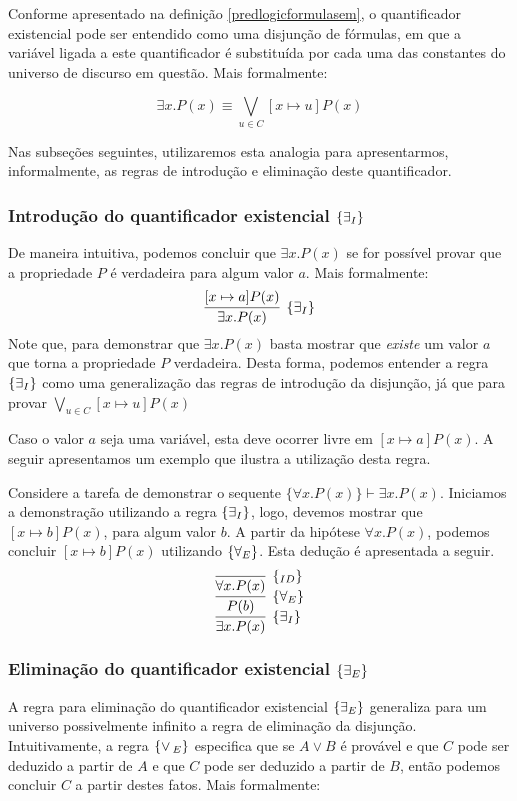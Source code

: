 Conforme apresentado na definição \ref{predlogicformulasem}, o
quantificador existencial pode ser entendido como uma disjunção de
fórmulas, em que a variável ligada a este quantificador é substituída
por cada uma das constantes do universo de discurso em questão. Mais
formalmente:

\[\exists x. P(x) \equiv \bigvee\limits_{u\in C}[x\mapsto u]P(x)\]

Nas subseções seguintes, utilizaremos esta analogia para
apresentarmos, informalmente, as regras de introdução e eliminação
deste quantificador.

\subsubsection{Introdução do quantificador existencial $\scriptsize{\{\exists_I}\}$}

De maneira intuitiva, podemos concluir que $\exists x. P(x)$ se for
possível provar que a propriedade $P$ é verdadeira para algum valor
$a$. Mais formalmente:
\[
\infer[\existsI]{\exists x. P(x)}
         {
           [x\mapsto a]P(x)
         }
\]
Note que, para demonstrar que $\exists x. P(x)$ basta mostrar que
\emph{existe} um valor $a$ que torna a propriedade $P$
verdadeira. Desta forma, podemos entender a regra $\scriptsize{\{\exists_I}\}$ como uma
generalização das regras de introdução da disjunção, já que para
provar $\bigvee_{u\in C}  [x\mapsto u]P(x)$

Caso o valor $a$ seja uma variável, esta deve ocorrer livre em
$[x\mapsto a]P(x)$. A seguir apresentamos um exemplo que ilustra a
utilização desta regra.
\begin{Example}
Considere a tarefa de demonstrar o sequente $\{\forall x. P(x)\}
\vdash \exists x. P(x)$. Iniciamos a demonstração utilizando a regra
$\scriptsize{\{\exists_I}\}$, logo, devemos mostrar que $[x\mapsto b]P(x)$, para algum
valor $b$. A partir da hipótese $\forall x .P(x)$, podemos concluir
$[x\mapsto b]P(x)$ utilizando $\scriptsize{\{\forall_E}\}$. Esta dedução é apresentada a
seguir.
\[
\infer[\existsI]{\exists x. P(x)}
        {
          \infer[\forallE]{P(b)}
                   {
                     \infer[\Id]{\forall x. P(x)}{}
                   }
        }
\]
\end{Example}

\subsubsection{Eliminação do quantificador existencial $\scriptsize{\{\exists_E}\}$}

A regra para eliminação do quantificador existencial $\scriptsize{\{\exists_E}\}$
generaliza para um universo possivelmente infinito a regra de
eliminação da disjunção. Intuitivamente,  a regra $\scriptsize{\{\lor\,_{E}\}}$ especifica
que se $A\lor B$ é provável e que $C$ pode ser deduzido a partir de
$A$ e que $C$ pode ser deduzido a partir de $B$, então podemos
concluir $C$ a partir destes fatos. Mais formalmente:

